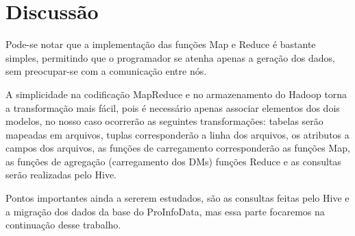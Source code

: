 \documentclass[a4paper,12pt]{article}
\begin{document}
\section{\textbf{Discussão}}
Pode-se notar que a implementação das funções Map e Reduce é bastante simples,
permitindo que o programador se atenha apenas a geração dos dados, sem preocupar-se
com a comunicação entre nós.

A simplicidade na codificação MapReduce e no armazenamento do Hadoop torna a
transformação mais fácil, pois é necessário apenas associar elementos
dos dois modelos, no nosso caso ocorrerão as seguintes transformações: tabelas serão
mapeadas em arquivos, tuplas corresponderão a linha dos arquivos, os atributos a 
campos dos arquivos, as funções de carregamento corresponderão as funções Map, as 
funções de agregação (carregamento dos DMs) funções Reduce e as consultas serão
realizadas pelo Hive.

Pontos importantes ainda a sererem estudados, são as consultas feitas pelo Hive
e a migração dos dados da base do ProInfoData, mas essa parte focaremos na
continuação desse trabalho. 



\end{document}
